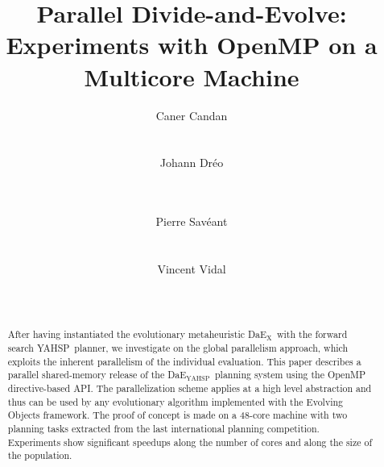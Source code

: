 \documentclass{sig-alternate}
\newcommand{\DAEX}{{\sc DaE$_{\text{X}}$}}
\newcommand{\DAEYAHSP}{{\sc DaE$_{\text{YAHSP}}$}}
\newcommand{\YAHSP}{{\sc YAHSP}}
\begin{document}
\title{Parallel Divide-and-Evolve: Experiments with OpenMP on a Multicore Machine}


\author{
\alignauthor
Caner Candan\\
       \\
       \\
\alignauthor
Johann Dr{\'e}o\\
       \\
       \\
\and
\alignauthor
Pierre Sav{\'e}ant\\
       \\
       \\
\alignauthor
Vincent Vidal\\
       \\
       \\
}

\maketitle
\begin{abstract}
After having instantiated the evolutionary metaheuristic \DAEX\ with the forward search \YAHSP\ planner, 
we investigate on the global parallelism approach, which exploits the inherent parallelism of the individual evaluation.
This paper describes a parallel shared-memory release of the \DAEYAHSP\ planning system using the OpenMP directive-based API.
The parallelization scheme applies at a high level abstraction and thus can be used by any evolutionary algorithm implemented with the Evolving Objects framework.
The proof of concept is made on a 48-core machine with two planning tasks extracted from the last international planning competition.
Experiments show significant speedups along the number of cores and along the size of the population.


\end{abstract}
\end{document}
